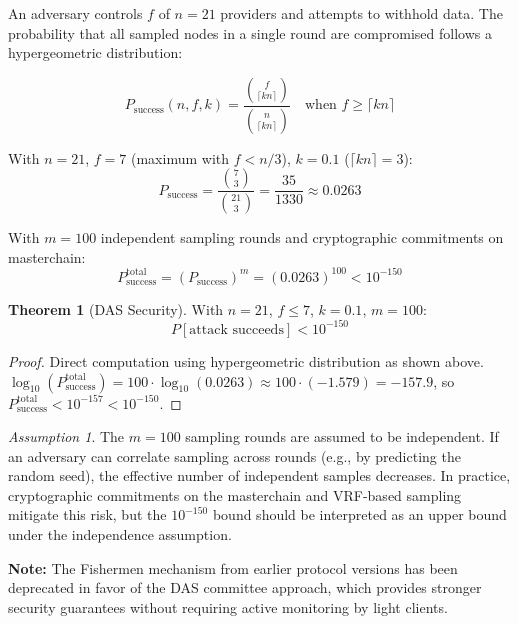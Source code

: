 \documentclass[12pt,a4paper]{article}
\theoremstyle{definition}
\newtheorem{theorem}{Theorem}[section]
\theoremstyle{remark}
\newtheorem{assumption}{Assumption}[section]
\begin{document}
An adversary controls $f$ of $n = 21$ providers and attempts to withhold data. The probability that all sampled nodes in a single round are compromised follows a hypergeometric distribution:

\begin{equation}
P_{\text{success}}(n, f, k) = \frac{\binom{f}{\lceil kn \rceil}}{\binom{n}{\lceil kn \rceil}} \quad \text{when } f \geq \lceil kn \rceil
\end{equation}

With $n = 21$, $f = 7$ (maximum with $f < n/3$), $k = 0.1$ ($\lceil kn \rceil = 3$):
\begin{equation}
P_{\text{success}} = \frac{\binom{7}{3}}{\binom{21}{3}} = \frac{35}{1330} \approx 0.0263
\end{equation}

With $m = 100$ independent sampling rounds and cryptographic commitments on masterchain:
\begin{equation}
P_{\text{success}}^{\text{total}} = (P_{\text{success}})^m = (0.0263)^{100} < 10^{-150}
\end{equation}

\begin{theorem}[DAS Security]
\label{thm:das-security}
With $n = 21$, $f \leq 7$, $k = 0.1$, $m = 100$:
\begin{equation}
P[\text{attack succeeds}] < 10^{-150}
\end{equation}
\end{theorem}

\begin{proof}
Direct computation using hypergeometric distribution as shown above. $\log_{10}(P_{\text{success}}^{\text{total}}) = 100 \cdot \log_{10}(0.0263) \approx 100 \cdot (-1.579) = -157.9$, so $P_{\text{success}}^{\text{total}} < 10^{-157} < 10^{-150}$.
\end{proof}

\begin{assumption}
\label{asm:sampling-independence}
The $m = 100$ sampling rounds are assumed to be independent. If an adversary can correlate sampling across rounds (e.g., by predicting the random seed), the effective number of independent samples decreases. In practice, cryptographic commitments on the masterchain and VRF-based sampling mitigate this risk, but the $10^{-150}$ bound should be interpreted as an upper bound under the independence assumption.
\end{assumption}

\textbf{Note:} The Fishermen mechanism from earlier protocol versions has been deprecated in favor of the DAS committee approach, which provides stronger security guarantees without requiring active monitoring by light clients.
\end{document}
